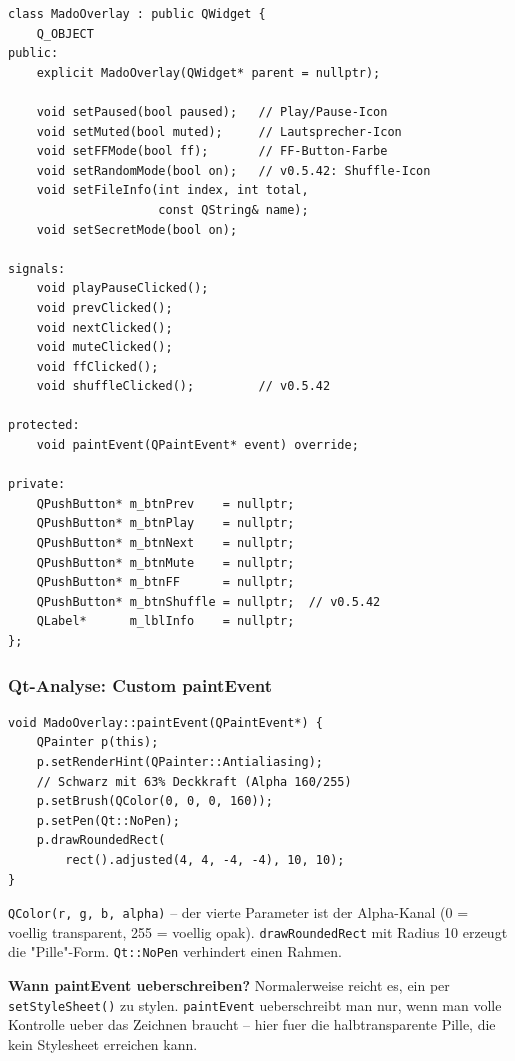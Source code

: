 \begin{lstlisting}[style=header, caption={madooverlay.h}]
class MadoOverlay : public QWidget {
    Q_OBJECT
public:
    explicit MadoOverlay(QWidget* parent = nullptr);

    void setPaused(bool paused);   // Play/Pause-Icon
    void setMuted(bool muted);     // Lautsprecher-Icon
    void setFFMode(bool ff);       // FF-Button-Farbe
    void setRandomMode(bool on);   // v0.5.42: Shuffle-Icon
    void setFileInfo(int index, int total,
                     const QString& name);
    void setSecretMode(bool on);

signals:
    void playPauseClicked();
    void prevClicked();
    void nextClicked();
    void muteClicked();
    void ffClicked();
    void shuffleClicked();         // v0.5.42

protected:
    void paintEvent(QPaintEvent* event) override;

private:
    QPushButton* m_btnPrev    = nullptr;
    QPushButton* m_btnPlay    = nullptr;
    QPushButton* m_btnNext    = nullptr;
    QPushButton* m_btnMute    = nullptr;
    QPushButton* m_btnFF      = nullptr;
    QPushButton* m_btnShuffle = nullptr;  // v0.5.42
    QLabel*      m_lblInfo    = nullptr;
};
\end{lstlisting}

\subsubsection{Qt-Analyse: Custom paintEvent}

\begin{lstlisting}[caption={MadoOverlay::paintEvent -- dunkle abgerundete Pille}]
void MadoOverlay::paintEvent(QPaintEvent*) {
    QPainter p(this);
    p.setRenderHint(QPainter::Antialiasing);
    // Schwarz mit 63% Deckkraft (Alpha 160/255)
    p.setBrush(QColor(0, 0, 0, 160));
    p.setPen(Qt::NoPen);
    p.drawRoundedRect(
        rect().adjusted(4, 4, -4, -4), 10, 10);
}
\end{lstlisting}

\verb|QColor(r, g, b, alpha)| -- der vierte Parameter
ist der Alpha-Kanal (0 = voellig transparent,
255 = voellig opak). \verb|drawRoundedRect| mit Radius 10
erzeugt die "Pille"-Form. \verb|Qt::NoPen| verhindert
einen Rahmen.

\begin{hinweis}
\textbf{Wann paintEvent ueberschreiben?}
Normalerweise reicht es, ein  per
\verb|setStyleSheet()| zu stylen.
\verb|paintEvent| ueberschreibt man nur, wenn man
volle Kontrolle ueber das Zeichnen braucht -- hier
fuer die halbtransparente Pille, die kein
Stylesheet erreichen kann.
\end{hinweis}

